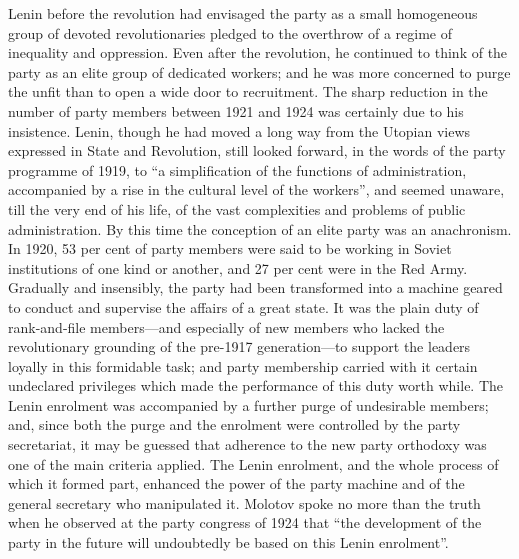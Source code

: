 Lenin before the revolution had envisaged the party as a small homogeneous group of devoted revolutionaries pledged to the overthrow of a regime of inequality and oppression. Even after the revolution, he continued to think of the party as an elite group of dedicated workers; and he was more concerned to purge the unfit than to open a wide door to recruitment. The sharp reduction in the number of party members between 1921 and 1924 was certainly due to his insistence. Lenin, though he had moved a long way from the Utopian views expressed in State and Revolution, still looked forward, in the words of the party programme of 1919, to ``a simplification of the functions of administration, accompanied by a rise in the cultural level of the workers'', and seemed unaware, till the very end of his life, of the vast complexities and problems of public administration. By this time the conception of an elite party was an anachronism. In 1920, 53 per cent of party members were said to be working in Soviet institutions of one kind or another, and 27 per cent were in the Red Army. Gradually and insensibly, the party had been transformed into a machine geared to conduct and supervise the affairs of a great state. It was the plain duty of rank-and-file members---and especially of new members who lacked the revolutionary grounding of the pre-1917 generation---to support the leaders loyally in this formidable task; and party membership carried with it certain undeclared privileges which made the performance of this duty worth while. The Lenin enrolment was accompanied by a further purge of undesirable members; and, since both the purge and the enrolment were controlled by the party secretariat, it may be guessed that adherence to the new party orthodoxy was one of the main criteria applied. The Lenin enrolment, and the whole process of which it formed part, enhanced the power of the party machine and of the general secretary who manipulated it. Molotov spoke no more than the truth when he observed at the party congress of 1924 that ``the development of the party in the future will undoubtedly be based on this Lenin enrolment''. 

